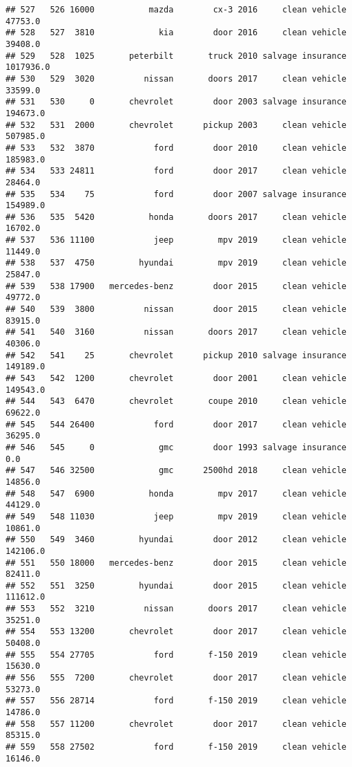 \documentclass[
]{article}
\begin{document}
\begin{verbatim}
## 527   526 16000           mazda        cx-3 2016     clean vehicle   47753.0
## 528   527  3810             kia        door 2016     clean vehicle   39408.0
## 529   528  1025       peterbilt       truck 2010 salvage insurance 1017936.0
## 530   529  3020          nissan       doors 2017     clean vehicle   33599.0
## 531   530     0       chevrolet        door 2003 salvage insurance  194673.0
## 532   531  2000       chevrolet      pickup 2003     clean vehicle  507985.0
## 533   532  3870            ford        door 2010     clean vehicle  185983.0
## 534   533 24811            ford        door 2017     clean vehicle   28464.0
## 535   534    75            ford        door 2007 salvage insurance  154989.0
## 536   535  5420           honda       doors 2017     clean vehicle   16702.0
## 537   536 11100            jeep         mpv 2019     clean vehicle   11449.0
## 538   537  4750         hyundai         mpv 2019     clean vehicle   25847.0
## 539   538 17900   mercedes-benz        door 2015     clean vehicle   49772.0
## 540   539  3800          nissan        door 2015     clean vehicle   83915.0
## 541   540  3160          nissan       doors 2017     clean vehicle   40306.0
## 542   541    25       chevrolet      pickup 2010 salvage insurance  149189.0
## 543   542  1200       chevrolet        door 2001     clean vehicle  149543.0
## 544   543  6470       chevrolet       coupe 2010     clean vehicle   69622.0
## 545   544 26400            ford        door 2017     clean vehicle   36295.0
## 546   545     0             gmc        door 1993 salvage insurance       0.0
## 547   546 32500             gmc      2500hd 2018     clean vehicle   14856.0
## 548   547  6900           honda         mpv 2017     clean vehicle   44129.0
## 549   548 11030            jeep         mpv 2019     clean vehicle   10861.0
## 550   549  3460         hyundai        door 2012     clean vehicle  142106.0
## 551   550 18000   mercedes-benz        door 2015     clean vehicle   82411.0
## 552   551  3250         hyundai        door 2015     clean vehicle  111612.0
## 553   552  3210          nissan       doors 2017     clean vehicle   35251.0
## 554   553 13200       chevrolet        door 2017     clean vehicle   50408.0
## 555   554 27705            ford       f-150 2019     clean vehicle   15630.0
## 556   555  7200       chevrolet        door 2017     clean vehicle   53273.0
## 557   556 28714            ford       f-150 2019     clean vehicle   14786.0
## 558   557 11200       chevrolet        door 2017     clean vehicle   85315.0
## 559   558 27502            ford       f-150 2019     clean vehicle   16146.0

\end{verbatim}
\end{document}

